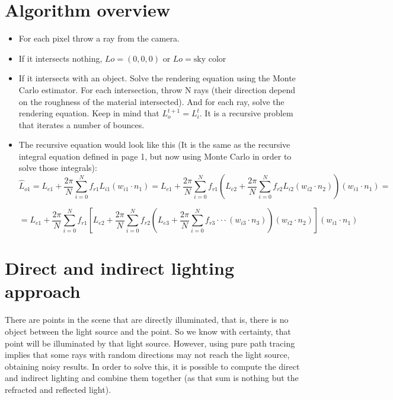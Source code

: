\documentclass{article}
\begin{document}
\section{Algorithm overview}

\begin{itemize}
  \item For each pixel throw a ray from the camera.
  \item If it intersects nothing, $L{o} = (0,0,0)$ or $L{o} = \text{sky color}$
  \item If it intersects with an object. Solve the rendering equation using the Monte Carlo estimator. For each intersection, throw N rays (their direction depend on the roughness of the material intersected). And for each ray, solve the rendering equation. Keep in mind that $L_{o}^{t+1} = L_{i}^{t}$. It is a recursive problem that iterates a number of bounces.
  \item The recursive equation would look like this (It is the same as the recursive integral equation defined in page 1, but now using Monte Carlo in order to solve those integrals):
  $$\hat{L}_{o1} = L_{e1} + \frac{2\pi}{N}\sum_{i=0}^{N}f_{r1}L_{i1} \left ( w_{i1} \cdot n_{1} \right ) =  L_{e1} + \frac{2\pi}{N}\sum_{i=0}^{N}f_{r1} \left(  L_{e2} + \frac{2\pi}{N}\sum_{i=0}^{N}f_{r2}L_{i2} \left ( w_{i2} \cdot n_{2} \right ) \right) \left ( w_{i1} \cdot n_{1} \right )=$$

  $$=L_{e1} + \frac{2\pi}{N}\sum_{i=0}^{N}f_{r1} \left[  L_{e2} + \frac{2\pi}{N}\sum_{i=0}^{N}f_{r2} \left( L_{e3} + \frac{2\pi}{N }\sum_{i=0}^{N}f_{r3} \cdot \cdot \cdot \left ( w_{i3} \cdot n_{3} \right ) \right) \left ( w_{i2} \cdot n_{2} \right ) \right] \left ( w_{i1} \cdot n_{1} \right )$$
\end{itemize}

\section{Direct and indirect lighting approach}
There are points in the scene that are directly illuminated, that is, there is no object between the light source and the point. So we know with certainty, that point will be illuminated by that light source. However, using pure path tracing implies that some rays with random directions may not reach the light source, obtaining noisy results.\newline
In order to solve this, it is possible to compute the direct and indirect lighting and combine them together (as that sum is nothing but the refracted and reflected light). 
\end{document}
